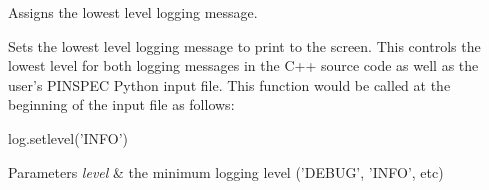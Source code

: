 Assigns the lowest level logging message. 

Sets the lowest level logging message to print to the screen. This controls the lowest level for both logging messages in the C++ source code as well as the user's P\-I\-N\-S\-P\-E\-C Python input file. This function would be called at the beginning of the input file as follows\-:


\begin{DoxyCode}
log.setlevel(\textcolor{stringliteral}{'INFO'})
\end{DoxyCode}



\begin{DoxyParams}{Parameters}
{\em level} & the minimum logging level ('D\-E\-B\-U\-G', 'I\-N\-F\-O', etc) \\
\hline
\end{DoxyParams}
